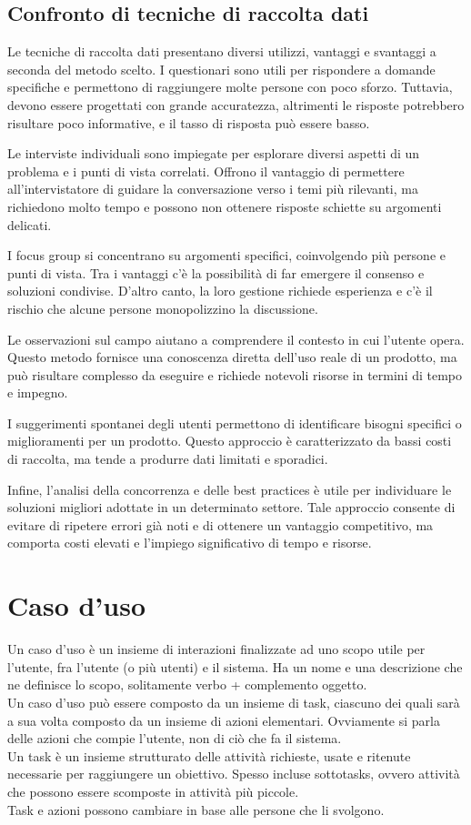 \documentclass{report}
\begin{document}
	\subsection{Confronto di tecniche di raccolta dati}
	Le tecniche di raccolta dati presentano diversi utilizzi, vantaggi e svantaggi a seconda del metodo scelto. I questionari sono utili per rispondere a domande specifiche e permettono di raggiungere molte persone con poco sforzo. Tuttavia, devono essere progettati con grande accuratezza, altrimenti le risposte potrebbero risultare poco informative, e il tasso di risposta può essere basso.

	Le interviste individuali sono impiegate per esplorare diversi aspetti di un problema e i punti di vista correlati. Offrono il vantaggio di permettere all'intervistatore di guidare la conversazione verso i temi più rilevanti, ma richiedono molto tempo e possono non ottenere risposte schiette su argomenti delicati.

	I focus group si concentrano su argomenti specifici, coinvolgendo più persone e punti di vista. Tra i vantaggi c'è la possibilità di far emergere il consenso e soluzioni condivise. D'altro canto, la loro gestione richiede esperienza e c'è il rischio che alcune persone monopolizzino la discussione.

	Le osservazioni sul campo aiutano a comprendere il contesto in cui l'utente opera. Questo metodo fornisce una conoscenza diretta dell'uso reale di un prodotto, ma può risultare complesso da eseguire e richiede notevoli risorse in termini di tempo e impegno.

	I suggerimenti spontanei degli utenti permettono di identificare bisogni specifici o miglioramenti per un prodotto. Questo approccio è caratterizzato da bassi costi di raccolta, ma tende a produrre dati limitati e sporadici.

	Infine, l'analisi della concorrenza e delle best practices è utile per individuare le soluzioni migliori adottate in un determinato settore. Tale approccio consente di evitare di ripetere errori già noti e di ottenere un vantaggio competitivo, ma comporta costi elevati e l'impiego significativo di tempo e risorse.

	\section{Caso d'uso}
	Un caso d'uso è un insieme di interazioni finalizzate ad uno scopo utile per l'utente, fra l'utente (o più utenti) e il sistema. Ha un nome e una descrizione che ne definisce lo scopo, solitamente verbo + complemento oggetto.\\
	Un caso d'uso può essere composto da un insieme di task, ciascuno dei quali sarà a sua volta composto da un insieme di azioni elementari. Ovviamente si parla delle azioni che compie l'utente, non di ciò che fa il sistema.\\
	Un task è un insieme strutturato delle attività richieste, usate e ritenute necessarie per raggiungere un obiettivo. Spesso incluse sottotasks, ovvero attività che possono essere scomposte in attività più piccole.\\
	Task e azioni possono cambiare in base alle persone che li svolgono.
\end{document}

